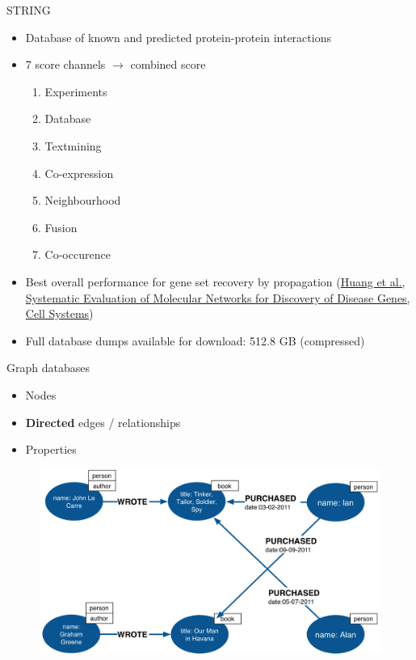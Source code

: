 \documentclass{beamer}
\begin{document}
\begin{frame}{STRING}
    \begin{itemize}
        \item Database of known and predicted protein-protein interactions
        \vfill
        \item 7 score channels $ \rightarrow $ combined score
        \begin{enumerate}
            \item Experiments
            \item Database
            \item Textmining
            \item Co-expression
            \item Neighbourhood
            \item Fusion
            \item Co-occurence
        \end{enumerate}
        \vfill
        \item Best overall performance for gene set recovery by propagation (\href{https://www.ncbi.nlm.nih.gov/pubmed/29605183}{Huang et al., Systematic Evaluation of Molecular Networks for Discovery of Disease Genes, Cell Systems})
        \vfill
        \item Full database dumps available for download: 512.8 GB (compressed)
    \end{itemize}
\end{frame}

\begin{frame}{Graph databases}
    \begin{itemize}
        \item Nodes
        \item \textbf{Directed} edges / relationships
        \item Properties
    \end{itemize}
    \begin{figure}
        \centering
        \includegraphics[width=0.75\linewidth]{graph_database.png}
    \end{figure}
\end{frame}
\end{document}

